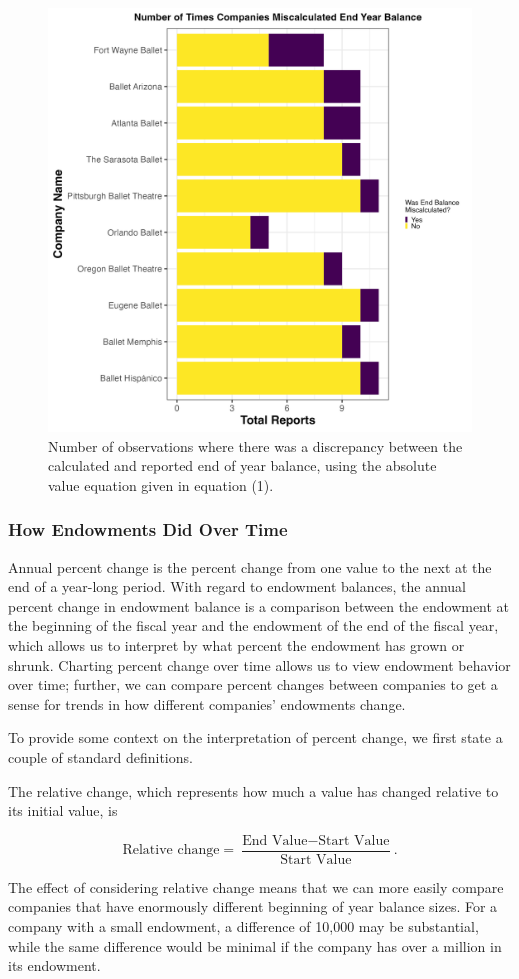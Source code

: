 \documentclass[Dance Data
Project,article,submit,moreauthors,pdftex]{mdpi}
\begin{document}
\begin{figure}[H]
\includegraphics[width=0.5\linewidth,]{../images/miscalc_end_bal} \caption{\label{fig:miscalc-by-comp}Number of observations where there was a discrepancy between the calculated and reported end of year balance, using the absolute value equation given in equation (1).}\label{fig:miscalc-by-comp}
\end{figure}

\hypertarget{how-endowments-did-over-time}{%
\subsubsection{How Endowments Did Over
Time}\label{how-endowments-did-over-time}}

Annual percent change is the percent change from one value to the next
at the end of a year-long period. With regard to endowment balances, the
annual percent change in endowment balance is a comparison between the
endowment at the beginning of the fiscal year and the endowment of the
end of the fiscal year, which allows us to interpret by what percent the
endowment has grown or shrunk. Charting percent change over time allows
us to view endowment behavior over time; further, we can compare percent
changes between companies to get a sense for trends in how different
companies' endowments change.

To provide some context on the interpretation of percent change, we
first state a couple of standard definitions.

The relative change, which represents how much a value has changed
relative to its initial value, is

\[\text{Relative change} = \dfrac{\text{End Value} - \text{Start Value}}{ \text{Start Value}}.\]

The effect of considering relative change means that we can more easily
compare companies that have enormously different beginning of year
balance sizes. For a company with a small endowment, a difference of
10,000 may be substantial, while the same difference would be minimal if
the company has over a million in its endowment.
\end{document}
